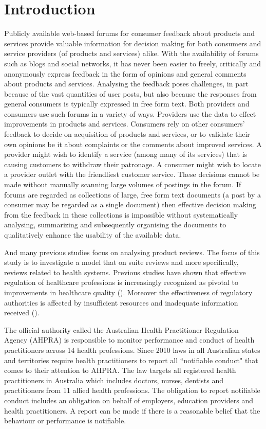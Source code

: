 \documentclass[11pt,twoside]{report}
\begin{document}
\chapter{Introduction}
Publicly available web-based
forums for consumer feedback about products and services 
provide valuable information for decision making for both consumers and
service providers (of products and services) alike. 
With the availability of forums such as blogs and social networks, 
it has never been easier to freely, critically and anonymously express 
feedback in the form of opinions and general comments about products and 
services.
Analysing the feedback poses challenges, in part because of the 
vast quantities of user posts, but also because the responses from general
consumers is typically expressed 
in free form text. Both providers and consumers use such forums in a variety 
of ways. Providers use the data to effect improvements in products and services.
Consumers rely on other consumers' feedback to decide on acquisition of
products and services, or to validate their own opinions be it about complaints
or the comments about improved services. A provider might wish to identify 
a service (among many of its services) that is causing customers to withdraw
their patronage. A consumer might wish to locate a provider outlet with the 
friendliest customer service.
These decisions cannot be made without manually scanning large volumes of 
postings in the forum. If forums are regarded as collections of large, free 
form text documents (a post by a consumer may be regarded as a single document)
then effective decision making from the feedback in these collections is
impossible without 
systematically analysing, summarizing and subsequently
organising the documents to qualitatively enhance the usability 
of the available data. 

And many previous studies focus on analysing product reviews. The focus of 
this study is to investigate a model that on suite reviews and more specifically, 
reviews related to health systems. Previous studies have shown that effective 
regulation of healthcare professions is increasingly recognized as pivotal to 
improvements in healthcare quality (\cite{ref6}). 
Moreover the effectiveness of regulatory authorities is affected by 
insufficient resources and inadequate information received (\cite{ref5}). 

The official authority called the Australian Health Practitioner Regulation 
Agency (AHPRA) is responsible to monitor performance and conduct of health 
practitioners across 14 health professions. Since 2010 laws in all Australian 
states and territories require health practitioners to report 
all ``notifiable conduct" that comes to their attention to AHPRA. 
The law targets all registered health practitioners in Australia 
which includes doctors, nurses, dentists and practitioners from 
11 allied health professions. The obligation to report notifiable 
conduct includes an obligation on behalf of employers, 
education providers and health practitioners. A report can be made 
if there is a reasonable belief that the behaviour or performance is notifiable. 
\end{document}
